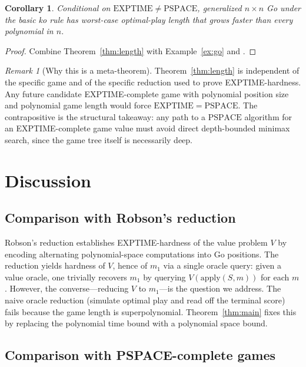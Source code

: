 \documentclass[11pt,a4paper]{amsart}
\theoremstyle{plain}
\newtheorem{corollary}[theorem]{Corollary}
\theoremstyle{definition}
\theoremstyle{remark}
\newtheorem{remark}[theorem]{Remark}
\newcommand{\EXPTIME}{\mathrm{EXPTIME}}
\newcommand{\PSPACE}{\mathrm{PSPACE}}
\newcommand{\Apply}{\mathrm{apply}}
\begin{document}
\begin{corollary}
\label{cor:go-length}
Conditional on $\EXPTIME \neq \PSPACE$, generalized $n \times n$ Go
under the basic ko rule has worst-case optimal-play length that grows
faster than every polynomial in $n$.
\end{corollary}

\begin{proof}
Combine Theorem~\ref{thm:length} with Example~\ref{ex:go} and
\cite{Rob83}.
\end{proof}

\begin{remark}[Why this is a meta-theorem]
\label{rem:meta}
Theorem~\ref{thm:length} is independent of the specific game and of
the specific reduction used to prove EXPTIME-hardness. Any future
candidate EXPTIME-complete game with polynomial position size and
polynomial game length would force $\EXPTIME = \PSPACE$.
The contrapositive is the structural takeaway: any path to a
$\PSPACE$ algorithm for an EXPTIME-complete game value must avoid
direct depth-bounded minimax search, since the game tree itself is
necessarily deep.
\end{remark}

\section{Discussion}
\label{sec:disc}

\subsection{Comparison with Robson's reduction}

Robson's reduction \cite{Rob83} establishes EXPTIME-hardness of the
value problem $V$ by encoding alternating polynomial-space
computations into Go positions. The reduction yields hardness of $V$,
hence of $m_1$ via a single oracle query: given a value oracle, one
trivially recovers $m_1$ by querying $V(\Apply(S, m))$ for each $m$.
However, the converse---reducing $V$ to $m_1$---is the question we
address. The naive oracle reduction (simulate optimal play and read
off the terminal score) fails because the game length is
superpolynomial. Theorem~\ref{thm:main} fixes this by replacing the
polynomial time bound with a polynomial space bound.

\subsection{Comparison with PSPACE-complete games}
\end{document}
